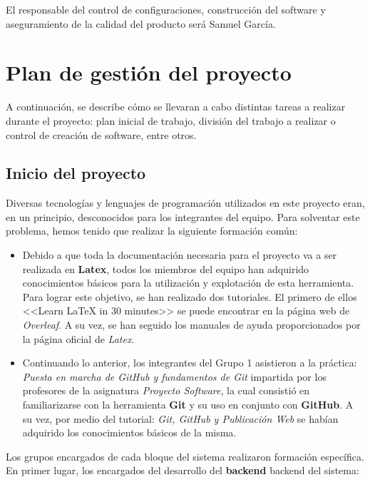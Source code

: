 \documentclass[11pt, a4paper, titlepage]{article}
\begin{document}
El responsable del control de configuraciones, construcción del software y aseguramiento de la calidad del producto será Samuel García.


\section{Plan de gestión del proyecto}

A continuación, se describe cómo se llevaran a cabo distintas tareas a realizar durante el proyecto: plan inicial de trabajo, división del trabajo a realizar o control de creación de software, entre otros.

\subsection{Inicio del proyecto}

Diversas tecnologías y lenguajes de programación utilizados en este proyecto eran, en un principio, desconocidos para los integrantes del equipo. Para solventar este problema, hemos tenido que realizar la siguiente formación común:

\begin{itemize}

\item Debido a que toda la documentación necesaria para el proyecto va a ser realizada en \textbf{Latex}, todos los miembros del equipo han adquirido conocimientos básicos para la utilización y explotación de esta herramienta. Para lograr este objetivo, se han realizado dos tutoriales. El primero de ellos <<Learn LaTeX in 30 minutes>>\cite{latextutorial1} se puede encontrar en la página web de \textit{Overleaf}. A su vez, se han seguido los manuales de ayuda proporcionados por la página oficial de \textit{Latex}\cite{latextutorial2}. 

\item Continuando lo anterior, los integrantes del Grupo 1 asistieron a la práctica: \textit{Puesta en marcha de GitHub y fundamentos de Git} impartida por los profesores de la asignatura \textit{Proyecto Software}, la cual consistió en familiarizarse con la herramienta \textbf{Git} y su uso en conjunto con \textbf{GitHub}. A su vez, por medio del tutorial: \textit{Git, GitHub y Publicación Web}\cite{githubtutorial} se habían adquirido los conocimientos básicos de la misma.

\end{itemize}

Los grupos encargados de cada bloque del sistema realizaron formación específica. En primer lugar, los encargados del desarrollo del \textbf{backend} backend del sistema:
\end{document}
